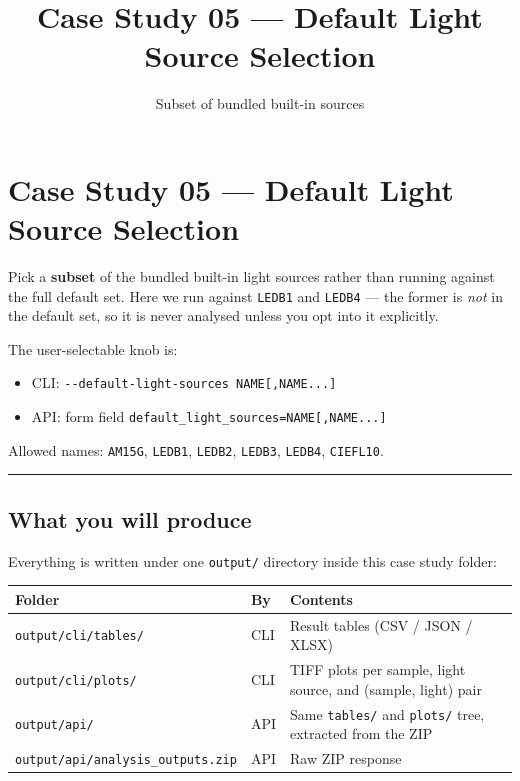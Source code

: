 \documentclass[
  11pt,
]{article}
\title{Case Study 05 — Default Light Source Selection}
\subtitle{Subset of bundled built-in sources}
\author{}
\date{}
\providecommand{\tightlist}{
  \setlength{\itemsep}{0pt}\setlength{\parskip}{0pt}}
\begin{document}
\maketitle

{
\hypersetup{linkcolor=}
\setcounter{tocdepth}{2}
\tableofcontents
}
\hypertarget{case-study-05--default-light-source-selection}{
\section{Case Study 05 --- Default Light Source
Selection}\label{case-study-05--default-light-source-selection}}

Pick a \textbf{subset} of the bundled built-in light sources rather than
running against the full default set. Here we run against \texttt{LEDB1}
and \texttt{LEDB4} --- the former is \emph{not} in the default set, so
it is never analysed unless you opt into it explicitly.

The user-selectable knob is:

\begin{itemize}
\tightlist
\item
  CLI: \texttt{-\/-default-light-sources\ NAME{[},NAME...{]}}
\item
  API: form field \texttt{default\_light\_sources=NAME{[},NAME...{]}}
\end{itemize}

Allowed names: \texttt{AM15G}, \texttt{LEDB1}, \texttt{LEDB2},
\texttt{LEDB3}, \texttt{LEDB4}, \texttt{CIEFL10}.

\begin{center}\rule{0.5\linewidth}{0.5pt}\end{center}

\hypertarget{what-you-will-produce}{
\subsection{What you will produce}\label{what-you-will-produce}}

Everything is written under one \texttt{output/} directory inside this
case study folder:

\begin{longtable}[]{@{}lll@{}}
\toprule
Folder & By & Contents \\
\midrule
\endhead
\texttt{output/cli/tables/} & CLI & Result tables (CSV / JSON / XLSX) \\
\texttt{output/cli/plots/} & CLI & TIFF plots per sample, light source,
and (sample, light) pair \\
\texttt{output/api/} & API & Same \texttt{tables/} and \texttt{plots/}
tree, extracted from the ZIP \\
\texttt{output/api/analysis\_outputs.zip} & API & Raw ZIP response \\
\bottomrule
\end{longtable}
\end{document}
